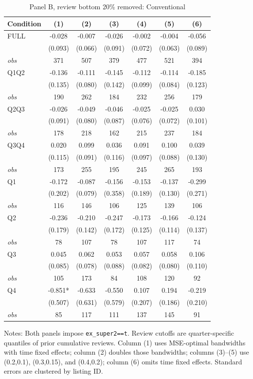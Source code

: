 \begin{table}[!htbp]
\centering
\caption{Panel B, review bottom 20\% removed: Conventional}
\begin{tabular}{lcccccc}
\toprule
Condition & (1) & (2) & (3) & (4) & (5) & (6) \\
\midrule
FULL & -0.028 & -0.007 & -0.026 & -0.002 & -0.004 & -0.056 \\
 & (0.093) & (0.066) & (0.091) & (0.072) & (0.063) & (0.089) \\
\textit{obs} & 371 & 507 & 379 & 477 & 521 & 394 \\
Q1Q2 & -0.136 & -0.111 & -0.145 & -0.112 & -0.114 & -0.185 \\
 & (0.135) & (0.080) & (0.142) & (0.099) & (0.084) & (0.123) \\
\textit{obs} & 190 & 262 & 184 & 232 & 256 & 179 \\
Q2Q3 & -0.026 & -0.049 & -0.046 & -0.025 & -0.025 & 0.030 \\
 & (0.091) & (0.080) & (0.087) & (0.076) & (0.072) & (0.101) \\
\textit{obs} & 178 & 218 & 162 & 215 & 237 & 184 \\
Q3Q4 & 0.020 & 0.099 & 0.036 & 0.091 & 0.100 & 0.039 \\
 & (0.115) & (0.091) & (0.116) & (0.097) & (0.088) & (0.130) \\
\textit{obs} & 173 & 255 & 195 & 245 & 265 & 193 \\
Q1 & -0.172 & -0.087 & -0.156 & -0.153 & -0.137 & -0.299 \\
 & (0.202) & (0.079) & (0.358) & (0.189) & (0.130) & (0.271) \\
\textit{obs} & 116 & 146 & 106 & 125 & 139 & 106 \\
Q2 & -0.236 & -0.210 & -0.247 & -0.173 & -0.166 & -0.124 \\
 & (0.179) & (0.142) & (0.172) & (0.125) & (0.114) & (0.137) \\
\textit{obs} & 78 & 107 & 78 & 107 & 117 & 74 \\
Q3 & 0.045 & 0.062 & 0.053 & 0.057 & 0.058 & 0.106 \\
 & (0.085) & (0.078) & (0.088) & (0.082) & (0.080) & (0.110) \\
\textit{obs} & 105 & 173 & 84 & 108 & 120 & 92 \\
Q4 & -0.851* & -0.633 & -0.550 & 0.107 & 0.194 & -0.219 \\
 & (0.507) & (0.631) & (0.579) & (0.207) & (0.186) & (0.210) \\
\textit{obs} & 85 & 117 & 111 & 137 & 145 & 91 \\
\bottomrule
\end{tabular}
\begin{minipage}{0.98\textwidth}\footnotesize
Notes: Both panels impose \texttt{ex\_super2==t}. Review cutoffs are quarter-specific quantiles of prior cumulative reviews. Column (1) uses MSE-optimal bandwidths with time fixed effects; column (2) doubles those bandwidths; columns (3)--(5) use (0.2,0.1), (0.3,0.15), and (0.4,0.2); column (6) omits time fixed effects. Standard errors are clustered by listing ID.
\end{minipage}
\end{table}

